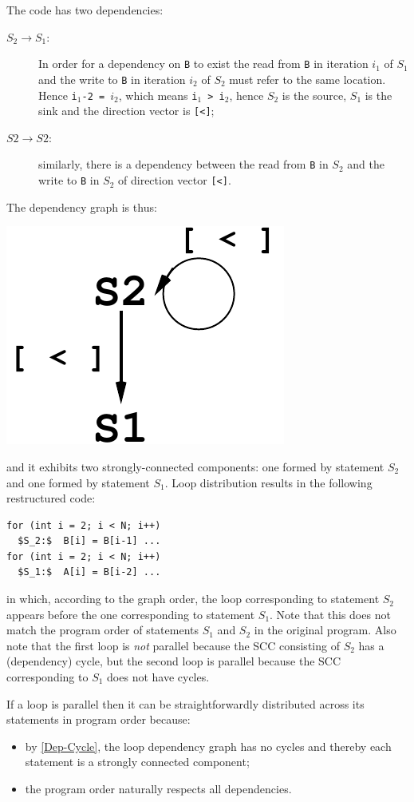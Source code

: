 The code has two dependencies:
\begin{description}
\item[$S_2\to S_1$:]  In order for a dependency on \texttt{B} to exist
  the read from \texttt{B} in iteration $i_1$ of $S_1$ and
  the write to \texttt{B} in iteration $i_2$ of $S_2$ must refer
  to the same location. Hence \texttt{i$_1$-2 = $i_2$}, which means
  \texttt{i$_1$ > i$_2$}, hence $S_2$ is the source, $S_1$ is the
  sink and the direction vector is \texttt{[<]};
\item[$S2\to S2$:] similarly, there is a dependency between the
  read from \texttt{B} in $S_2$ and the write to \texttt{B} in $S_2$
  of direction vector \texttt{[<]}.
\end{description}

The dependency graph is thus:
\begin{center}
\includegraphics[height=15ex]{img/LoopDistr.pdf}
\end{center}

\noindent and it exhibits two strongly-connected components:
one formed by statement $S_2$ and one formed by statement $S_1$.
Loop distribution results in the following restructured code:
\begin{lstlisting}[mathescape=true]
for (int i = 2; i < N; i++)
  $S_2:$  B[i] = B[i-1] ...
for (int i = 2; i < N; i++)
  $S_1:$  A[i] = B[i-2] ...
\end{lstlisting}
in which, according to the graph order, the loop corresponding to
statement $S_2$ appears before the one corresponding to statement
$S_1$. Note that this does not match the program order of statements
$S_1$ and $S_2$ in the original program. Also note that the first loop
is \emph{not} parallel because the SCC consisting of $S_2$ has a
(dependency) cycle, but the second loop is parallel because the SCC
corresponding to $S_1$ does not have cycles.

If a loop is parallel then it can be straightforwardly distributed
across its statements in program order because:
\begin{itemize}
\item by \cref{Dep-Cycle}, the loop dependency graph has no cycles and
  thereby each statement is a strongly connected component;
\item the program order naturally respects all dependencies.
\end{itemize}

